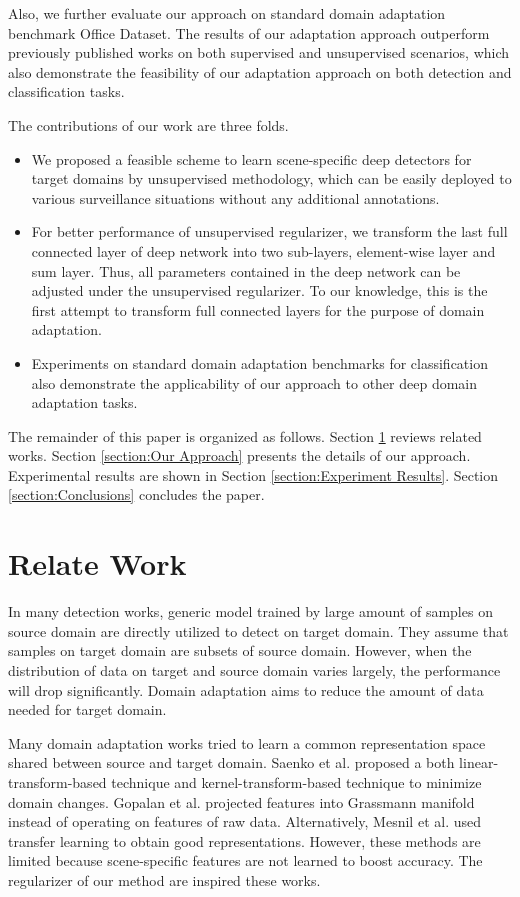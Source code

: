 \documentclass[runningheads]{llncs}
\begin{document}
Also, we further evaluate our approach on standard domain adaptation benchmark Office Dataset. The results of our adaptation approach outperform previously published works on both supervised and unsupervised scenarios, which also demonstrate the feasibility of our adaptation approach on both detection and classification tasks.

The contributions of our work are three folds.
\begin{itemize}
\item We proposed a feasible scheme to learn scene-specific deep detectors for target domains by unsupervised methodology, which can be easily deployed to various surveillance situations without any additional annotations.
\item For better performance of unsupervised regularizer, we transform the last full connected layer of deep network into two sub-layers, element-wise layer and sum layer. Thus, all parameters contained in the deep network can be adjusted under the unsupervised regularizer. To our knowledge, this is the first attempt to transform full connected layers for the purpose of domain adaptation.
\item Experiments on standard domain adaptation benchmarks for classification also demonstrate the applicability of our approach to other deep domain adaptation tasks.
\end{itemize}

The remainder of this paper is organized as follows. Section \ref{section:Relate Work} reviews related works. Section \ref{section:Our Approach} presents the details of our approach. Experimental results are shown in Section \ref{section:Experiment Results}. Section \ref{section:Conclusions} concludes the paper.

\section{Relate Work}
\label{section:Relate Work}

In many detection works, generic model trained by large amount of samples on source domain are directly utilized to detect on target domain. They assume that samples on target domain are subsets of source domain. However, when the distribution of data on target and source domain varies largely, the performance will drop significantly. Domain adaptation aims to reduce the amount of data needed for target domain.

Many domain adaptation works tried to learn a common representation space shared between source and target domain. Saenko et al. \cite{saenko2010adapting,kulis2011you} proposed a both linear-transform-based technique and kernel-transform-based technique to minimize domain changes. Gopalan et al. \cite{gopalan2011domain} projected features into Grassmann manifold instead of operating on features of raw data. Alternatively, Mesnil et al. \cite{mesnil2012unsupervised} used transfer learning to obtain good representations. However, these methods are limited because scene-specific features are not learned to boost accuracy. The regularizer of our method are inspired these works.
\end{document}
